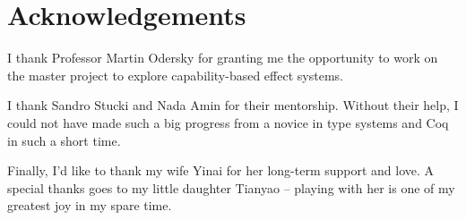 \section*{\centering Acknowledgements}

I thank Professor Martin Odersky for granting me the opportunity to
work on the master project to explore capability-based effect systems.

I thank Sandro Stucki and Nada Amin for their mentorship. Without
their help, I could not have made such a big progress from a novice in
type systems and Coq in such a short time.

Finally, I'd like to thank my wife Yinai for her long-term support and
love. A special thanks goes to my little daughter Tianyao -- playing
with her is one of my greatest joy in my spare time.
